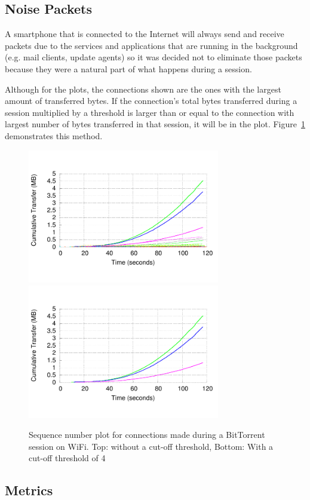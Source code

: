 \documentclass[letterpaper]{sig-alternate-10pt}
\begin{document}
\subsection{Noise Packets}

A smartphone that is connected to the Internet will always send and receive packets due to the services and applications that are running in the background (e.g. mail clients, update agents) so it was decided not to eliminate those packets because they were a natural part of what happens during a session.

Although for the plots, the connections shown are the ones with the largest amount of transferred bytes. If the connection's total bytes transferred during a session multiplied by a threshold is larger than or equal to the connection with largest number of bytes transferred in that session, it will be in the plot. Figure~\ref{fig:tors} demonstrates this method.

\begin{figure}[ht]
\centering
\includegraphics[width=3.3in]{figures/tor_nothr}
\includegraphics[width=3.3in]{figures/tor_thr}
\caption{Sequence number plot for connections made during a BitTorrent session on WiFi. Top: without a cut-off threshold, Bottom: With a cut-off threshold of 4}
\label{fig:tors}
\end{figure}

\subsection{Metrics}
\end{document}
